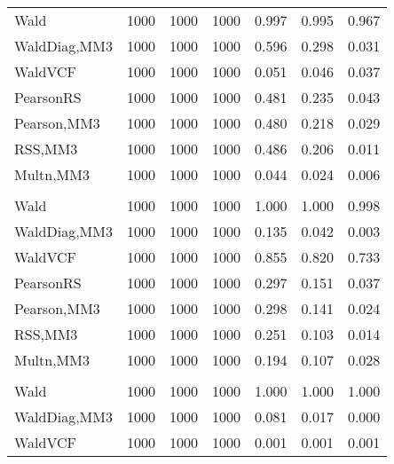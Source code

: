 \documentclass[
]{article}
\begin{document}
\begin{table}[H]
{\begin{tabular}[t]{lrrrrrr}
\hspace{1em}Wald & 1000 & 1000 & 1000 & 0.997 & 0.995 & 0.967\\
\hspace{1em}WaldDiag,MM3 & 1000 & 1000 & 1000 & 0.596 & 0.298 & 0.031\\
\hspace{1em}WaldVCF & 1000 & 1000 & 1000 & 0.051 & 0.046 & 0.037\\
\hspace{1em}PearsonRS & 1000 & 1000 & 1000 & 0.481 & 0.235 & 0.043\\
\hspace{1em}Pearson,MM3 & 1000 & 1000 & 1000 & 0.480 & 0.218 & 0.029\\
\hspace{1em}RSS,MM3 & 1000 & 1000 & 1000 & 0.486 & 0.206 & 0.011\\
\hspace{1em}Multn,MM3 & 1000 & 1000 & 1000 & 0.044 & 0.024 & 0.006\\
\addlinespace[0.3em]
\multicolumn{7}{l}{\textbf{2F 10V}}\\
\hspace{1em}Wald & 1000 & 1000 & 1000 & 1.000 & 1.000 & 0.998\\
\hspace{1em}WaldDiag,MM3 & 1000 & 1000 & 1000 & 0.135 & 0.042 & 0.003\\
\hspace{1em}WaldVCF & 1000 & 1000 & 1000 & 0.855 & 0.820 & 0.733\\
\hspace{1em}PearsonRS & 1000 & 1000 & 1000 & 0.297 & 0.151 & 0.037\\
\hspace{1em}Pearson,MM3 & 1000 & 1000 & 1000 & 0.298 & 0.141 & 0.024\\
\hspace{1em}RSS,MM3 & 1000 & 1000 & 1000 & 0.251 & 0.103 & 0.014\\
\hspace{1em}Multn,MM3 & 1000 & 1000 & 1000 & 0.194 & 0.107 & 0.028\\
\addlinespace[0.3em]
\multicolumn{7}{l}{\textbf{3F 15V}}\\
\hspace{1em}Wald & 1000 & 1000 & 1000 & 1.000 & 1.000 & 1.000\\
\hspace{1em}WaldDiag,MM3 & 1000 & 1000 & 1000 & 0.081 & 0.017 & 0.000\\
\hspace{1em}WaldVCF & 1000 & 1000 & 1000 & 0.001 & 0.001 & 0.001\\

\end{tabular}}
\end{table}
\end{document}
